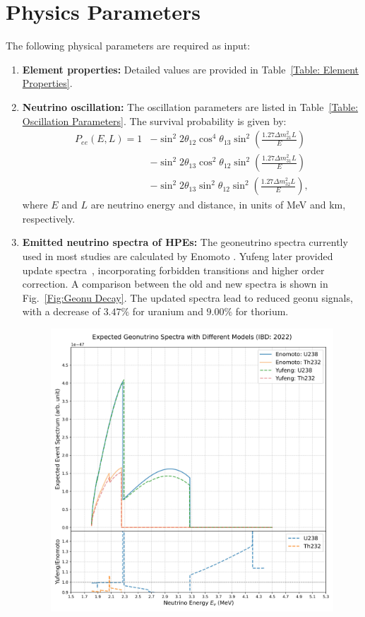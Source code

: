 		\section{Physics Parameters}
			The following physical parameters are required as input:
				\begin{enumerate}
					\item \textbf{Element properties:} Detailed values are provided in Table~\ref{Table: Element Properties}.
					\item \textbf{Neutrino oscillation:} The oscillation parameters are listed in Table~\ref{Table: Oscillation Parameters}. The survival probability is given by:
					\begin{equation}
						\begin{aligned}
							P_{ee}(E, L)
							= 1  
							&- \sin^2 2\theta_{12}\cos^4 \theta_{13} \sin^2\left(\frac{1.27 \Delta m_{21}^2 L}{E}\right) \\
							&- \sin^2 2\theta_{13}\cos^2 \theta_{12} \sin^2\left(\frac{1.27 \Delta m_{31}^2 L}{E}\right) \\
							&- \sin^2 2\theta_{13}\sin^2 \theta_{12} \sin^2\left(\frac{1.27 \Delta m_{32}^2 L}{E}\right),
						\end{aligned}
					\end{equation}
					where $E$ and $L$ are neutrino energy and distance, in units of MeV and km, respectively.
					\item \textbf{Emitted neutrino spectra of HPEs:} The geoneutrino spectra currently used in most studies are calculated by Enomoto \cite{Enomoto_Spectrum}. Yufeng later provided update spectra~\cite{GeonSpectra-2024}, incorporating forbidden transitions and higher order correction. A comparison between the old and new spectra is shown in Fig.~\ref{Fig:Geonu Decay}. The updated spectra lead to reduced geonu signals, with a decrease of $3.47\%$ for uranium and $9.00\%$ for thorium.
						\begin{figure}[H]
							\centering
							\includegraphics[scale = 0.5]{./Pics/Comparison_All_Expected_Geonu_Spectra_IBD_2022.jpg}

\end{figure}
\end{enumerate}
